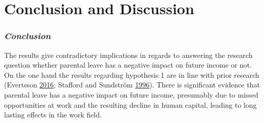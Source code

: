 \documentclass[
  12pt,
]{article}
\begin{document}
\hypertarget{conclusion-and-discussion}{%
\section{Conclusion and Discussion}\label{conclusion-and-discussion}}

\hypertarget{conclusion}{%
\subsubsection*{\texorpdfstring{\emph{Conclusion}}{Conclusion}}\label{conclusion}}

The results give contradictory implications in regards to answering the research question whether parental leave has a negative impact on future income or not. On the one hand the results regarding hypothesis 1 are in line with prior research (Evertsson \protect\hyperlink{ref-evertsson_parental_2016}{2016}; Stafford and Sundström \protect\hyperlink{ref-stafford_time_1996}{1996}). There is significant evidence that parental leave has a negative impact on future income, presumably due to missed opportunities at work and the resulting decline in human capital, leading to long lasting effects in the work field.
\end{document}
